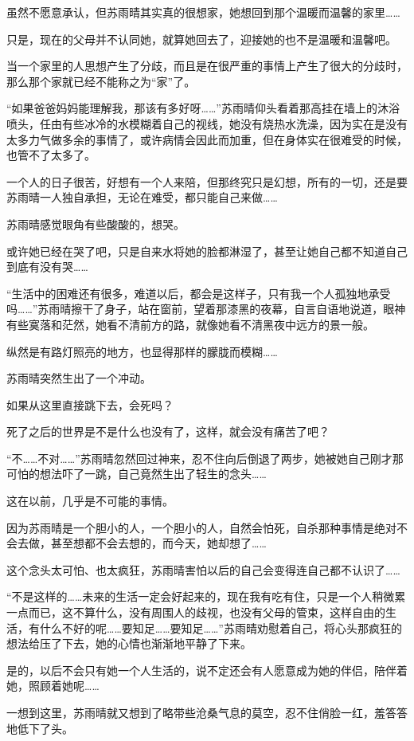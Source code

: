 虽然不愿意承认，但苏雨晴其实真的很想家，她想回到那个温暖而温馨的家里……

只是，现在的父母并不认同她，就算她回去了，迎接她的也不是温暖和温馨吧。

当一个家里的人思想产生了分歧，而且是在很严重的事情上产生了很大的分歧时，那么那个家就已经不能称之为“家”了。

“如果爸爸妈妈能理解我，那该有多好呀……”苏雨晴仰头看着那高挂在墙上的沐浴喷头，任由有些冰冷的水模糊着自己的视线，她没有烧热水洗澡，因为实在是没有太多力气做多余的事情了，或许病情会因此而加重，但在身体实在很难受的时候，也管不了太多了。

一个人的日子很苦，好想有一个人来陪，但那终究只是幻想，所有的一切，还是要苏雨晴一人独自承担，无论在难受，都只能自己来做……

苏雨晴感觉眼角有些酸酸的，想哭。

或许她已经在哭了吧，只是自来水将她的脸都淋湿了，甚至让她自己都不知道自己到底有没有哭……

“生活中的困难还有很多，难道以后，都会是这样子，只有我一个人孤独地承受吗……”苏雨晴擦干了身子，站在窗前，望着那漆黑的夜幕，自言自语地说道，眼神有些寞落和茫然，她看不清前方的路，就像她看不清黑夜中远方的景一般。

纵然是有路灯照亮的地方，也显得那样的朦胧而模糊……

苏雨晴突然生出了一个冲动。

如果从这里直接跳下去，会死吗？

死了之后的世界是不是什么也没有了，这样，就会没有痛苦了吧？

“不……不对……”苏雨晴忽然回过神来，忍不住向后倒退了两步，她被她自己刚才那可怕的想法吓了一跳，自己竟然生出了轻生的念头……

这在以前，几乎是不可能的事情。

因为苏雨晴是一个胆小的人，一个胆小的人，自然会怕死，自杀那种事情是绝对不会去做，甚至想都不会去想的，而今天，她却想了……

这个念头太可怕、也太疯狂，苏雨晴害怕以后的自己会变得连自己都不认识了……

“不是这样的……未来的生活一定会好起来的，现在我有吃有住，只是一个人稍微累一点而已，这不算什么，没有周围人的歧视，也没有父母的管束，这样自由的生活，有什么不好的呢……要知足……要知足……”苏雨晴劝慰着自己，将心头那疯狂的想法给压了下去，她的心情也渐渐地平静了下来。

是的，以后不会只有她一个人生活的，说不定还会有人愿意成为她的伴侣，陪伴着她，照顾着她呢……

一想到这里，苏雨晴就又想到了略带些沧桑气息的莫空，忍不住俏脸一红，羞答答地低下了头。

